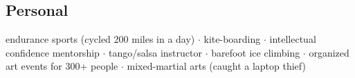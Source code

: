 \documentclass{res}
\begin{document}
\begin{resume}
\section{Personal}          
endurance sports (cycled 200 miles in a day) $\cdot$
kite-boarding $\cdot$
intellectual confidence mentorship $\cdot$
tango/salsa instructor $\cdot$
barefoot ice climbing $\cdot$
organized art events for 300+ people $\cdot$
mixed-martial arts (caught a laptop thief)
 
\end{resume}
\end{document}
